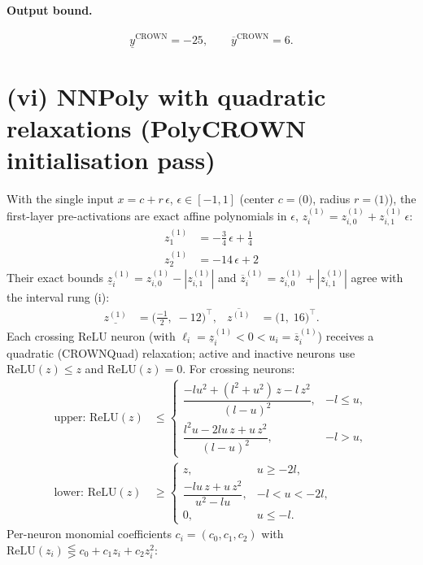 \documentclass[11pt]{article}
\begin{document}
\paragraph{Output bound.}
\begin{equation*}
\underline{y}^{\text{CROWN}} = -25, \qquad \overline{y}^{\text{CROWN}} = 6.
\end{equation*}

\section{(vi) NNPoly with quadratic relaxations (PolyCROWN initialisation pass)}
With the single input $x = c + r\,\epsilon$, $\epsilon \in [-1, 1]$ (center $c = \bigl(0\bigr)$, radius $r = \bigl(1\bigr)$), the first-layer pre-activations are exact affine polynomials in $\epsilon$, $z^{(1)}_i = z^{(1)}_{i,0} + z^{(1)}_{i,1}\,\epsilon$:
\begin{align*}
z^{(1)}_{1} &= -\frac{3}{4}\,\epsilon + \frac{1}{4} \\
z^{(1)}_{2} &= -14\,\epsilon + 2
\end{align*}
Their exact bounds $\underline{z}^{(1)}_i = z^{(1)}_{i,0} - |z^{(1)}_{i,1}|$ and $\overline{z}^{(1)}_i = z^{(1)}_{i,0} + |z^{(1)}_{i,1}|$ agree with the interval rung (i):
\begin{align*}
\underline{z^{(1)}} &= \bigl(\frac{-1}{2},\; -12\bigr)^{\!\top}, & \overline{z^{(1)}} &= \bigl(1,\; 16\bigr)^{\!\top}.
\end{align*}
Each crossing ReLU neuron (with $\ell_i = \underline{z}^{(1)}_i < 0 < u_i = \overline{z}^{(1)}_i$)
receives a quadratic (CROWNQuad) relaxation; active and inactive neurons use $\mathrm{ReLU}(z) \le z$
and $\mathrm{ReLU}(z) = 0$. For crossing neurons:
\begin{align*}
\text{upper: } \mathrm{ReLU}(z) &\le \begin{cases} \dfrac{-l u^2 + (l^2 + u^2)\, z - l\, z^2}{(l - u)^2}, & -l \le u, \\[3mm] \dfrac{l^2 u - 2 l u\, z + u\, z^2}{(l - u)^2}, & -l > u, \end{cases} \\[2mm]
\text{lower: } \mathrm{ReLU}(z) &\ge \begin{cases} z, & u \ge -2l, \\[3mm] \dfrac{-l u\, z + u\, z^2}{u^2 - l u}, & -l < u < -2l, \\[3mm] 0, & u \le -l. \end{cases}
\end{align*}
Per-neuron monomial coefficients $c_i = (c_0, c_1, c_2)$ with $\mathrm{ReLU}(z_i) \lesseqgtr c_0 + c_1 z_i + c_2 z_i^2$:
\end{document}
